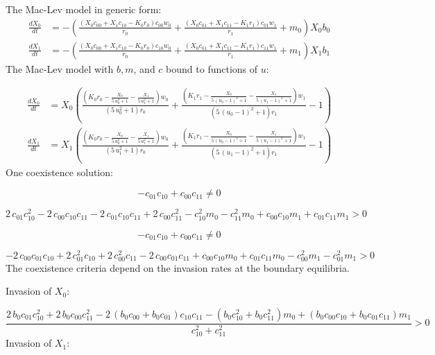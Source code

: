 \documentclass{article}
\begin{document}
The Mac-Lev model in generic form: 
\[\begin{align*}
\frac{dX_{0}}{dt} &= -{\left(\frac{{\left(X_{0} c_{00} + X_{1} c_{10} - K_{0} r_{0}\right)} c_{00} w_{0}}{r_{0}} + \frac{{\left(X_{0} c_{01} + X_{1} c_{11} - K_{1} r_{1}\right)} c_{01} w_{1}}{r_{1}} + m_{0}\right)} X_{0} b_{0}\\
\frac{dX_{1}}{dt} &= -{\left(\frac{{\left(X_{0} c_{00} + X_{1} c_{10} - K_{0} r_{0}\right)} c_{10} w_{0}}{r_{0}} + \frac{{\left(X_{0} c_{01} + X_{1} c_{11} - K_{1} r_{1}\right)} c_{11} w_{1}}{r_{1}} + m_{1}\right)} X_{1} b_{1}
\end{align*} \
\]
The Mac-Lev model with $b, m$, and $c$ bound to functions of $u$:

\[\begin{align*}
\frac{dX_{0}}{dt} &= X_{0} {\left(\frac{{\left(K_{0} r_{0} - \frac{X_{0}}{5 \, u_{0}^{2} + 1} - \frac{X_{1}}{5 \, u_{1}^{2} + 1}\right)} w_{0}}{{\left(5 \, u_{0}^{2} + 1\right)} r_{0}} + \frac{{\left(K_{1} r_{1} - \frac{X_{0}}{5 \, {\left(u_{0} - 1\right)}^{2} + 1} - \frac{X_{1}}{5 \, {\left(u_{1} - 1\right)}^{2} + 1}\right)} w_{1}}{{\left(5 \, {\left(u_{0} - 1\right)}^{2} + 1\right)} r_{1}} - 1\right)}\\
\frac{dX_{1}}{dt} &= X_{1} {\left(\frac{{\left(K_{0} r_{0} - \frac{X_{0}}{5 \, u_{0}^{2} + 1} - \frac{X_{1}}{5 \, u_{1}^{2} + 1}\right)} w_{0}}{{\left(5 \, u_{1}^{2} + 1\right)} r_{0}} + \frac{{\left(K_{1} r_{1} - \frac{X_{0}}{5 \, {\left(u_{0} - 1\right)}^{2} + 1} - \frac{X_{1}}{5 \, {\left(u_{1} - 1\right)}^{2} + 1}\right)} w_{1}}{{\left(5 \, {\left(u_{1} - 1\right)}^{2} + 1\right)} r_{1}} - 1\right)}
\end{align*} \
\]
One coexistence solution:

\[-c_{01} c_{10} + c_{00} c_{11} \neq 0 \
\]

\[2 \, c_{01} c_{10}^{2} - 2 \, c_{00} c_{10} c_{11} - 2 \, c_{01} c_{10} c_{11} + 2 \, c_{00} c_{11}^{2} - c_{10}^{2} m_{0} - c_{11}^{2} m_{0} + c_{00} c_{10} m_{1} + c_{01} c_{11} m_{1} > 0 \
\]

\[-c_{01} c_{10} + c_{00} c_{11} \neq 0 \
\]

\[-2 \, c_{00} c_{01} c_{10} + 2 \, c_{01}^{2} c_{10} + 2 \, c_{00}^{2} c_{11} - 2 \, c_{00} c_{01} c_{11} + c_{00} c_{10} m_{0} + c_{01} c_{11} m_{0} - c_{00}^{2} m_{1} - c_{01}^{2} m_{1} > 0 \
\]
The coexistence criteria depend on the invasion rates at the boundary equilibria.

Invasion of $X_{0}$:

\[\frac{2 \, b_{0} c_{01} c_{10}^{2} + 2 \, b_{0} c_{00} c_{11}^{2} - 2 \, {\left(b_{0} c_{00} + b_{0} c_{01}\right)} c_{10} c_{11} - {\left(b_{0} c_{10}^{2} + b_{0} c_{11}^{2}\right)} m_{0} + {\left(b_{0} c_{00} c_{10} + b_{0} c_{01} c_{11}\right)} m_{1}}{c_{10}^{2} + c_{11}^{2}} > 0 \
\]
Invasion of $X_{1}$:
\end{document}
